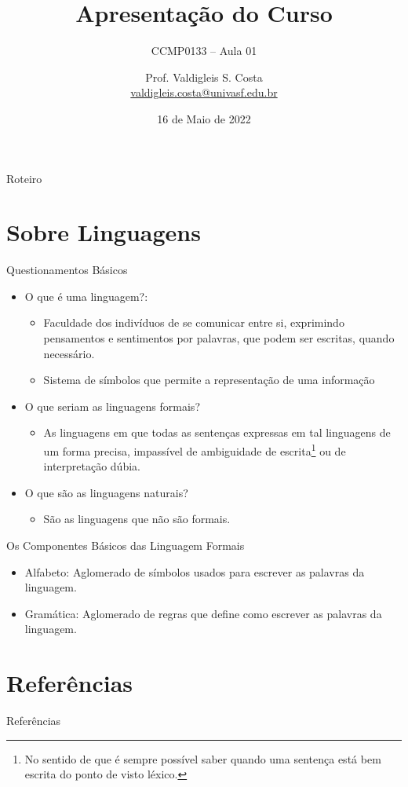 \documentclass{beamer}
\title{Apresentação do Curso}
\subtitle{CCMP0133 -- Aula 01}
\date{16 de Maio de 2022}
\author{Prof. Valdigleis S. Costa\\\url{valdigleis.costa@univasf.edu.br}}
\institute{Universidade Federal do Vale do São Francisco\\Colegiado de Ciência da Computação\\\textit{Campus} Salgueiro-PE}
\begin{document}
	\maketitle
	\begin{frame}{Roteiro}
		\tableofcontents
	\end{frame}
	
	\section{Sobre Linguagens}

	\begin{frame}{Questionamentos Básicos}
		\begin{itemize}
			\item O que é uma linguagem?:
			\begin{itemize}
				\item Faculdade dos indivíduos de se comunicar entre si, exprimindo pensamentos e sentimentos por palavras, que podem ser escritas, quando necessário.
				\item Sistema de símbolos que permite a representação de uma informação\pause
			\end{itemize}
			\item O que seriam as linguagens formais?\pause
			\begin{itemize}
				\item As linguagens em que todas as sentenças expressas em tal linguagens de um forma precisa, impassível de ambiguidade de escrita\footnote{No sentido de que é sempre possível saber quando uma sentença está bem escrita do ponto de visto léxico.} ou de interpretação dúbia.
			\end{itemize}
			\item O que são as linguagens naturais?\pause
			\begin{itemize}
				\item São as linguagens que não são formais.
			\end{itemize}
		\end{itemize}
	\end{frame}

	\begin{frame}{Os Componentes Básicos das Linguagem Formais}
		\begin{itemize}
			\item Alfabeto: {\color{red}Aglomerado} de símbolos usados para escrever as palavras da linguagem.\pause
			\item Gramática: {\color{red}Aglomerado} de regras que define como escrever as palavras da linguagem.\pause
		\end{itemize}
	\end{frame}

	\section{Referências}
	
	\begin{frame}[allowframebreaks]{Referências}
		
	\end{frame}
\end{document}
